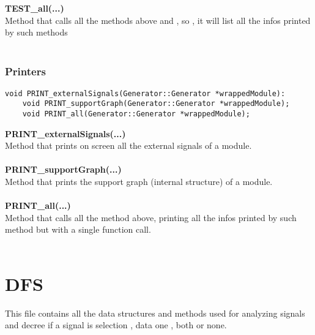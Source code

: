 \documentclass{article}
\newcommand{\sectionbreak}{\clearpage}
\begin{document}
\textbf{TEST\_all(...)}\\
Method that calls all the methods above and , so , it will list all the infos printed by such methods\\\\

\subsubsection{Printers}

\begin{mdframed}[hidealllines=true, backgroundcolor=magenta!10]
	\begin{lstlisting}[basicstyle=\tiny]
	void PRINT_externalSignals(Generator::Generator *wrappedModule):
	void PRINT_supportGraph(Generator::Generator *wrappedModule);
	void PRINT_all(Generator::Generator *wrappedModule);
	\end{lstlisting}
\end{mdframed}

\textbf{PRINT\_externalSignals(...)}\\
Method that prints on screen all the external signals of a module.\\\\

\textbf{PRINT\_supportGraph(...)}\\
Method that prints the support graph (internal structure) of a module.\\\\

\textbf{PRINT\_all(...)}\\
Method that calls all the method above, printing all the infos printed by such method but with a single function call.\\\\

\sectionbreak{\clearpage}


\section{DFS}

This file contains all the data structures and methods used for analyzing signals and decree if a signal is selection , data one , both or none.\\
\end{document}
